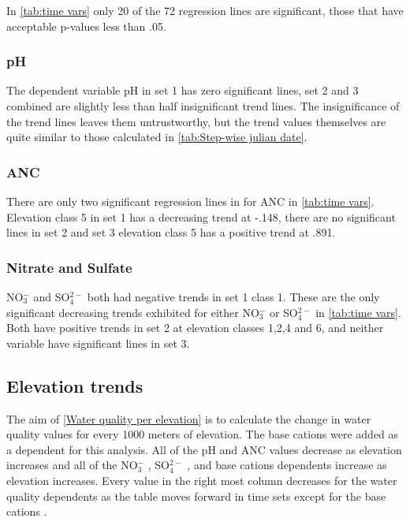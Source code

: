 In \autoref{tab:time vars} only 20 of the 72 regression lines are significant, those that have acceptable p-values less than .05.

\subsubsection{pH}

The dependent variable pH in set 1 has zero significant lines, set 2 and 3 combined are slightly less than half insignificant trend lines. 
The insignificance of the trend lines leaves them untrustworthy, but the trend values themselves are quite similar to those calculated in \autoref{tab:Step-wise julian date}.

\subsubsection{ANC}

There are only two significant regression lines in for ANC in \autoref{tab:time vars}. 
Elevation class 5 in set 1 has a decreasing trend at -.148, there are no significant lines in set 2 and set 3 elevation class 5 has a positive trend at .891.

\subsubsection{Nitrate and Sulfate}

NO$_3^-$ and SO$_4^{2-}$ both had negative trends in set 1 class 1. 
These are the only significant decreasing trends exhibited for either NO$_3^-$ or SO$_4^{2-}$  in \autoref{tab:time vars}.  Both have positive trends in set 2 at elevation classes 1,2,4 and 6, and neither variable have significant lines in set 3.

\subsection{Elevation trends}

The aim of \autoref{Water quality per elevation} is to calculate the change in water quality values for every 1000 meters of elevation.  
The base cations were added as a dependent for this analysis.  
All of the pH and ANC values decrease as elevation increases and all of the  NO$_3^-$ , SO$_4^{2-}$ , and base cations dependents increase as elevation increases. 
 Every value in the right most column decreases for the water quality dependents as the table moves forward in time sets except for the base cations .

